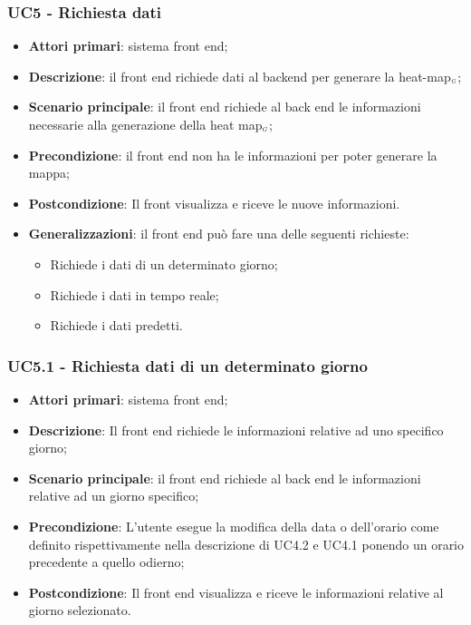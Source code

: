 \subsubsection{UC5 - Richiesta dati}
\begin{itemize}
	\item \textbf{Attori primari}: sistema front end;
	\item \textbf{Descrizione}: il front end richiede dati al backend per generare la heat-map$_{\scaleto{G}{3pt}}$;
	\item \textbf{Scenario principale}: il front end richiede al back end le informazioni necessarie alla generazione della heat map$_{\scaleto{G}{3pt}}$;
	\item \textbf{Precondizione}: il front end non ha le informazioni per poter generare la mappa;
	\item \textbf{Postcondizione}: Il front visualizza e riceve le nuove informazioni. 
	\item \textbf{Generalizzazioni}: il front end può fare una delle seguenti richieste:
	\begin{itemize}
		\item Richiede i dati di un determinato giorno;
		\item Richiede i dati in tempo reale;
		\item Richiede i dati predetti.
	\end{itemize}
\end{itemize}

\subsubsection{UC5.1 - Richiesta dati di un determinato giorno}
\begin{itemize}
	\item \textbf{Attori primari}: sistema front end;
	\item \textbf{Descrizione}: Il front end richiede le informazioni relative ad uno specifico giorno;
	\item \textbf{Scenario principale}:  il front end richiede al back end le informazioni relative ad un giorno specifico;
	\item \textbf{Precondizione}: L’utente esegue la modifica della data o dell’orario come definito rispettivamente nella descrizione di UC4.2 e UC4.1 ponendo un orario precedente a quello odierno;
	\item \textbf{Postcondizione}: Il front end visualizza e riceve le informazioni relative al giorno selezionato. 
\end{itemize}

